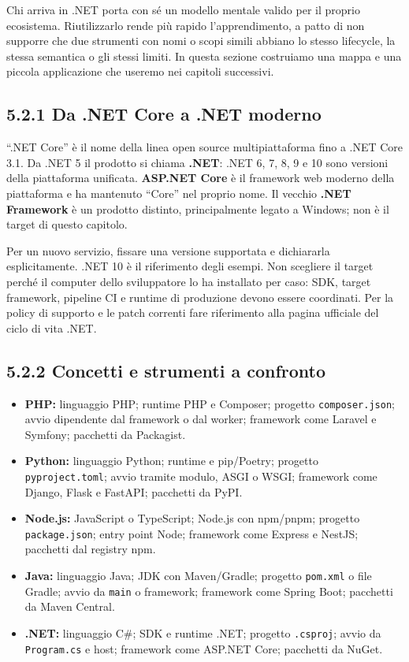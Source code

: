 \documentclass[
  italian,
  10pt,
]{book}
\providecommand{\tightlist}{%
  \setlength{\itemsep}{0pt}\setlength{\parskip}{0pt}}
\begin{document}
Chi arriva in .NET porta con sé un modello mentale valido per il proprio
ecosistema. Riutilizzarlo rende più rapido l'apprendimento, a patto di
non supporre che due strumenti con nomi o scopi simili abbiano lo stesso
lifecycle, la stessa semantica o gli stessi limiti. In questa sezione
costruiamo una mappa e una piccola applicazione che useremo nei capitoli
successivi.

\subsection{5.2.1 Da .NET Core a .NET
moderno}\label{da-.net-core-a-.net-moderno}

``.NET Core'' è il nome della linea open source multipiattaforma fino a
.NET Core 3.1. Da .NET 5 il prodotto si chiama \textbf{.NET}: .NET 6, 7,
8, 9 e 10 sono versioni della piattaforma unificata. \textbf{ASP.NET
Core} è il framework web moderno della piattaforma e ha mantenuto
``Core'' nel proprio nome. Il vecchio \textbf{.NET Framework} è un
prodotto distinto, principalmente legato a Windows; non è il target di
questo capitolo.

Per un nuovo servizio, fissare una versione supportata e dichiararla
esplicitamente. .NET 10 è il riferimento degli esempi. Non scegliere il
target perché il computer dello sviluppatore lo ha installato per caso:
SDK, target framework, pipeline CI e runtime di produzione devono essere
coordinati. Per la policy di supporto e le patch correnti fare
riferimento alla pagina ufficiale del ciclo di vita .NET.

\subsection{5.2.2 Concetti e strumenti a
confronto}\label{concetti-e-strumenti-a-confronto}

\begin{itemize}
\tightlist
\item
  \textbf{PHP:} linguaggio PHP; runtime PHP e Composer; progetto
  \texttt{composer.json}; avvio dipendente dal framework o dal worker;
  framework come Laravel e Symfony; pacchetti da Packagist.
\item
  \textbf{Python:} linguaggio Python; runtime e pip/Poetry; progetto
  \texttt{pyproject.toml}; avvio tramite modulo, ASGI o WSGI; framework
  come Django, Flask e FastAPI; pacchetti da PyPI.
\item
  \textbf{Node.js:} JavaScript o TypeScript; Node.js con npm/pnpm;
  progetto \texttt{package.json}; entry point Node; framework come
  Express e NestJS; pacchetti dal registry npm.
\item
  \textbf{Java:} linguaggio Java; JDK con Maven/Gradle; progetto
  \texttt{pom.xml} o file Gradle; avvio da \texttt{main} o framework;
  framework come Spring Boot; pacchetti da Maven Central.
\item
  \textbf{.NET:} linguaggio C\#; SDK e runtime .NET; progetto
  \texttt{.csproj}; avvio da \texttt{Program.cs} e host; framework come
  ASP.NET Core; pacchetti da NuGet.
\end{itemize}
\end{document}
